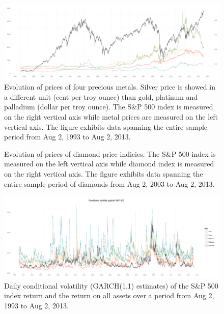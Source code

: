 \documentclass[preprint,authoryear,11pt]{elsarticle}
\begin{document}
\begin{figure}
	\centering
	\includegraphics[scale=0.3]{metal_prices}
	\caption{Evolution of prices of four precious metals. Silver price is showed in a different unit (cent per troy ounce) than gold, platinum and palladium (dollar per troy ounce). The S\&P 500 index is measured on the right vertical axis while metal prices are measured on the left vertical axis. The figure exhibits data spanning the entire sample period from Aug 2, 1993 to Aug 2, 2013.}   %
	\label{fig:metal_sp500}
\end{figure}

\begin{figure}
	\centering
	\caption{Evolution of prices of diamond price indicies. The S\&P 500 index is measured on the left vertical axis while diamond index is measured on the right vertical axis. The figure exhibits data spanning the entire sample period of diamonds from Aug 2, 2003 to Aug 2, 2013.}
	\label{fig:diamond_sp500}
\end{figure}

\begin{figure}
	\centering
	\includegraphics[scale=0.34]{sp500Plot}
	\caption{Daily conditional volatility (GARCH(1,1) estimates) of the S\&P 500 index return and the return on all assets over a period from Aug 2, 1993 to Aug 2, 2013. }
	\label{fig:sp500Plot}
\end{figure}


\end{document}
